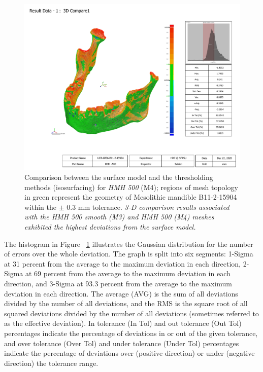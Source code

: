 \documentclass[review]{elsarticle}
\begin{document}
\begin{figure}[ht]\centering
\includegraphics[width=\linewidth]{fig3.pdf}
\caption{Comparison between the surface model and the thresholding methods (isosurfacing) for \textit{HMH 500} (M4); regions of mesh topology in green represent the geometry of Mesolithic mandible B11-2-15904 within the $\pm$ 0.3 mm tolerance. \textit{3-D comparison results associated with the HMH 500 smooth (M3) and HMH 500 (M4) meshes exhibited the highest deviations from the surface model.}}
\label{fig:Fig3}
\end{figure}

The histogram in Figure ~\ref{fig:Fig3} illustrates the Gaussian distribution for the number of errors over the whole deviation. The graph is split into six segments: 1-Sigma at 31 percent from the average to the maximum deviation in each direction, 2-Sigma at 69 percent from the average to the maximum deviation in each direction, and 3-Sigma at 93.3 percent from the average to the maximum deviation in each direction. The average (AVG) is the sum of all deviations divided by the number of all deviations, and the RMS is the square root of all squared deviations divided by the number of all deviations (sometimes referred to as the effective deviation). In tolerance (In Tol) and out tolerance (Out Tol) percentages indicate the percentage of deviations in or out of the given tolerance, and over tolerance (Over Tol) and under tolerance (Under Tol) percentages indicate the percentage of deviations over (positive direction) or under (negative direction) the tolerance range. 
\end{document}
